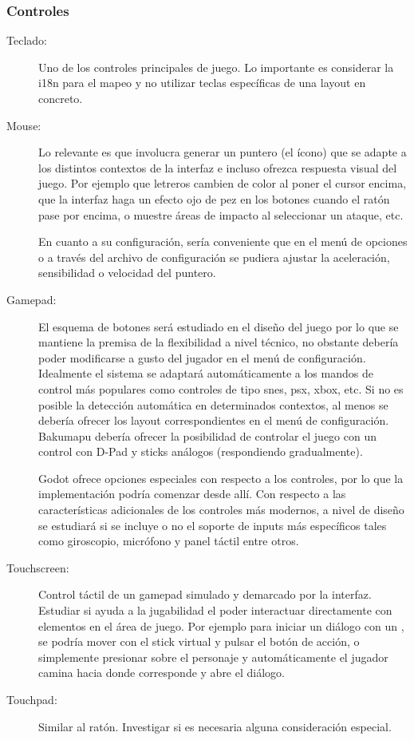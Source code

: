 \subsubsection{Controles}
\begin{description}
\item[Teclado:] Uno de los controles principales de juego. Lo importante es considerar la i18n para el mapeo y no utilizar teclas específicas de una layout en concreto.

\item[Mouse:] Lo relevante es que involucra generar un puntero (el ícono) que se adapte a los distintos contextos de la interfaz e incluso ofrezca respuesta visual del juego. Por ejemplo que letreros cambien de color al poner el cursor encima, que la interfaz haga un efecto ojo de pez en los botones cuando el ratón pase por encima, o muestre áreas de impacto al seleccionar un ataque, etc.

En cuanto a su configuración, sería conveniente que en el menú de opciones o a través del archivo de configuración se pudiera ajustar la aceleración, sensibilidad o velocidad del puntero. 

\item[Gamepad:] El esquema de botones será estudiado en el diseño del juego por lo que se mantiene la premisa de la flexibilidad a nivel técnico, no obstante debería poder modificarse a gusto del jugador en el menú de configuración. Idealmente el sistema se adaptará automáticamente a los mandos de control más populares como controles de tipo snes, psx, xbox, etc. Si no es posible la detección automática en determinados contextos, al menos se debería ofrecer los layout correspondientes en el menú de configuración. Bakumapu debería ofrecer la posibilidad de controlar el juego con un control con D-Pad y sticks análogos (respondiendo gradualmente).

Godot ofrece opciones especiales con respecto a los controles, por lo que la implementación podría comenzar desde allí. Con respecto a las características adicionales de los controles más modernos, a nivel de diseño se estudiará si se incluye o no el soporte de inputs más específicos tales como giroscopio, micrófono y panel táctil entre otros.

\item[Touchscreen:] Control táctil de un gamepad simulado y demarcado por la interfaz. Estudiar si ayuda a la jugabilidad el poder interactuar directamente con elementos en el área de juego. Por ejemplo para iniciar un diálogo con un , se podría mover con el stick virtual y pulsar el botón de acción, o simplemente presionar sobre el personaje y automáticamente el jugador camina hacia donde corresponde y abre el diálogo.

\item[Touchpad:] Similar al ratón. Investigar si es necesaria alguna consideración especial.
\end{description}

